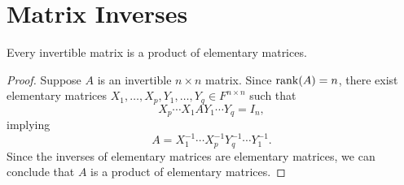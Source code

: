 \section{Matrix Inverses}
\begin{theorem}
  Every invertible matrix is a product of elementary matrices.
\end{theorem}
\begin{proof}
  Suppose $A$ is an invertible $n \times n$ matrix.
  Since $\operatorname{rank}(A) = n$, there exist elementary matrices
  $X_1, \dots, X_p, Y_1, \dots, Y_q \in F^{n \times n}$ such that
  \begin{equation*}
    X_p \cdots X_1 A Y_1 \cdots Y_q = I_n,
  \end{equation*}
  implying
  \begin{equation*}
    A = X_1^{-1} \cdots X_p^{-1} Y_q^{-1} \cdots Y_1^{-1}.
  \end{equation*}
  Since the inverses of elementary matrices are elementary matrices,
  we can conclude that $A$ is a product of elementary matrices.
\end{proof}

